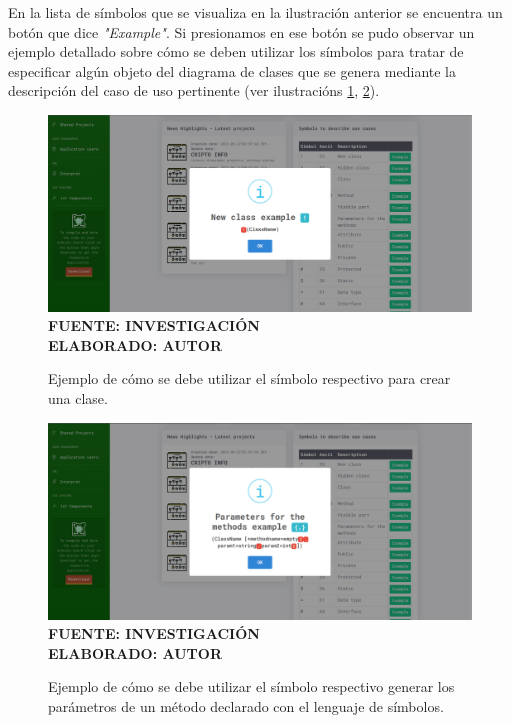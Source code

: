 En la lista de símbolos que se visualiza en la ilustración anterior se encuentra un botón que dice \textit{"Example"}. Si presionamos en ese botón se pudo observar un ejemplo detallado sobre cómo se deben utilizar los símbolos para tratar de especificar algún objeto del diagrama de clases que se genera mediante la descripción del caso de uso pertinente (ver ilustracións \ref{fig:ejemploclase}, \ref{fig:ejemploparametro}).

\begin{figure}[H]
	\centering
	\caption{Ejemplo de cómo se debe utilizar el símbolo respectivo para crear una clase.}
	\includegraphics[width=14cm]{img/res_002.png}
	\label{fig:ejemploclase}
	\vspace{4mm}
	{\footnotesize \textbf{\\ FUENTE: INVESTIGACIÓN} \textbf{\\ ELABORADO: AUTOR}}
\end{figure}

\begin{figure}[H]
	\centering
	\caption{Ejemplo de cómo se debe utilizar el símbolo respectivo generar los parámetros de un método declarado con el lenguaje de símbolos.}
	\includegraphics[width=14cm]{img/res_003.png}
	\label{fig:ejemploparametro}
	\vspace{4mm}
	{\footnotesize \textbf{\\ FUENTE: INVESTIGACIÓN} \textbf{\\ ELABORADO: AUTOR}}
\end{figure}

